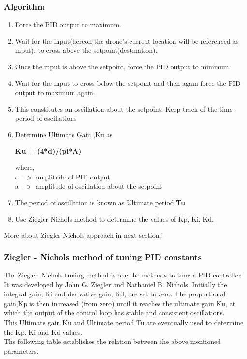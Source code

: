 \documentclass[a4paper,12pt,oneside]{book}
\begin{document}
\subsubsection{Algorithm}
\begin{enumerate}
    \item Force the PID output to maximum.
    \item Wait for the input(hereon the drone's current location will be referenced as input), to cross above the setpoint(destination).
    \item Once the input is above the setpoint, force the PID output to minimum.
    \item Wait for the input to cross below the setpoint and then again force the PID output to maximum again.
    \item This constitutes an oscillation about the setpoint. Keep track of the time period of oscillations
    \item Determine Ultimate Gain ,Ku as
        \begin{center}
            \textbf{Ku = (4*d)/(pi*A)}
        \end{center}
        where,\\
        d --$>$ amplitude of PID output\\
        a --$>$ amplitude of oscillation about the setpoint
    \item The period of oscillation is known as Ultimate period \textbf{Tu}
    \item Use Ziegler-Nichols method to determine the values of Kp, Ki, Kd.
\end{enumerate}
More about Ziegler-Nichols approach in next section.!

\subsubsection{Ziegler - Nichols method of tuning PID constants}
The Ziegler–Nichols tuning method is one the methods to tune a PID controller. It was developed by John G. Ziegler and Nathaniel B. Nichols. Initially the integral gain, Ki and derivative gain, Kd, are set to zero. The proportional gain,Kp is then increased (from zero) until it reaches the ultimate gain Ku, at which the output of the control loop has stable and consistent oscillations.\\
This Ultimate gain Ku and Ultimate period Tu are eventually used to determine the Kp, Ki and Kd values.\\
The following table establishes the relation between the above mentioned parameters.\\
\end{document}
